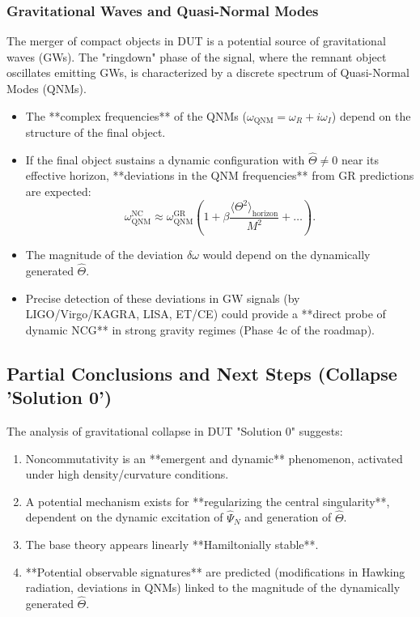 \documentclass[11pt, a4paper]{article}
\theoremstyle{remark}
\newcommand{\Op}[1]{\hat{#1}}
\begin{document}
\subsubsection{Gravitational Waves and Quasi-Normal Modes}
\label{ssubsec:nc_gw_qnm}
The merger of compact objects in DUT is a potential source of gravitational waves (GWs). The "ringdown" phase of the signal, where the remnant object oscillates emitting GWs, is characterized by a discrete spectrum of Quasi-Normal Modes (QNMs).
\begin{itemize}
    \item The **complex frequencies** of the QNMs (\( \omega_{\text{QNM}} = \omega_R + i \omega_I \)) depend on the structure of the final object.
    \item If the final object sustains a dynamic configuration with \( \Op{\Theta} \neq 0 \) near its effective horizon, **deviations in the QNM frequencies** from GR predictions are expected:
      \[ \omega_{\text{QNM}}^{\text{NC}} \approx \omega_{\text{QNM}}^{\text{GR}} \left( 1 + \beta \frac{\langle \Theta^2 \rangle_{\text{horizon}}}{M^2} + \dots \right). \]
    \item The magnitude of the deviation \( \delta \omega \) would depend on the dynamically generated \( \Op{\Theta} \).
    \item Precise detection of these deviations in GW signals (by LIGO/Virgo/KAGRA, LISA, ET/CE) could provide a **direct probe of dynamic NCG** in strong gravity regimes (Phase 4c of the roadmap).
\end{itemize}

\subsection{Partial Conclusions and Next Steps (Collapse 'Solution 0')}
\label{subsec:collapse_conclusions_outlook}

The analysis of gravitational collapse in DUT "Solution 0" suggests:
\begin{enumerate}
    \item Noncommutativity is an **emergent and dynamic** phenomenon, activated under high density/curvature conditions.
    \item A potential mechanism exists for **regularizing the central singularity**, dependent on the dynamic excitation of \( \Op{\Psi}_N \) and generation of \( \Op{\Theta} \).
    \item The base theory appears linearly **Hamiltonially stable**.
    \item **Potential observable signatures** are predicted (modifications in Hawking radiation, deviations in QNMs) linked to the magnitude of the dynamically generated \( \Op{\Theta} \).
\end{enumerate}
\end{document}
